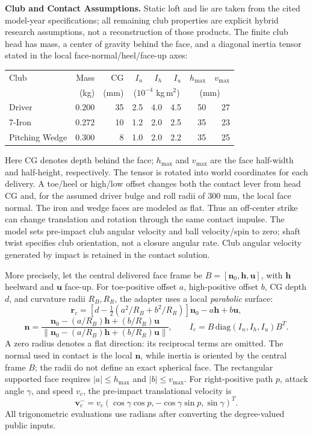 \documentclass[11pt,letterpaper]{article}
\begin{document}
\textbf{Club and Contact Assumptions.} Static loft and lie are taken from the
cited model-year specifications; all remaining club properties are explicit
hybrid research assumptions, not a reconstruction of those products. The
finite club head has mass, a center of gravity behind the face, and a diagonal
inertia tensor stated in the local face-normal/heel/face-up axes:
\begin{center}\small
\begin{tabular}{lrrrrrrr}
\toprule
Club & Mass & CG & $I_n$ & $I_h$ & $I_u$ & $h_{\max}$ & $v_{\max}$\\
 & (kg) & (mm) & \multicolumn{3}{c}{($10^{-4}$ kg\,m$^2$)} & \multicolumn{2}{c}{(mm)}\\
\midrule
Driver & 0.200 & 35 & 2.5 & 4.0 & 4.5 & 50 & 27\\
7-Iron & 0.272 & 10 & 1.2 & 2.0 & 2.5 & 35 & 23\\
Pitching Wedge & 0.300 & 8 & 1.0 & 2.0 & 2.2 & 35 & 25\\
\bottomrule
\end{tabular}
\end{center}
Here CG denotes depth behind the face; $h_{\max}$ and $v_{\max}$ are the
face half-width and half-height, respectively. The tensor is rotated into
world coordinates for each delivery. A toe/heel or
high/low offset changes both the contact lever from head CG and, for the
assumed driver bulge and roll radii of 300 mm, the local face normal. The iron
and wedge faces are modeled as flat. Thus an off-center strike can
change translation and rotation through the same contact impulse. The model
sets pre-impact club angular velocity and ball velocity/spin to zero; shaft
twist specifies club orientation, not a closure angular rate. Club angular
velocity generated by impact is retained in the contact solution.

More precisely, let the central delivered face frame be
$B=[\mathbf n_0,\mathbf h,\mathbf u]$, with $\mathbf h$ heelward and
$\mathbf u$ face-up. For toe-positive offset $a$, high-positive offset $b$,
CG depth $d$, and curvature radii $R_B,R_R$, the adapter uses a local
\emph{parabolic} surface:
\[
 \mathbf r_c=\left[d-\tfrac12(a^2/R_B+b^2/R_R)\right]\mathbf n_0
              -a\mathbf h+b\mathbf u,
\]
\[
 \mathbf n=\frac{\mathbf n_0-(a/R_B)\mathbf h+(b/R_R)\mathbf u}
 {\|\mathbf n_0-(a/R_B)\mathbf h+(b/R_R)\mathbf u\|},\qquad
 I_c=B\,\mathrm{diag}(I_n,I_h,I_u)B^T.
\]
A zero radius denotes a flat direction: its reciprocal terms are omitted.
The normal used in contact is the local $\mathbf n$, while inertia is oriented
by the central frame $B$; the radii do not define an exact spherical face.
The rectangular supported face requires $|a|\le h_{\max}$ and
$|b|\le v_{\max}$. For right-positive path $p$, attack angle $\gamma$,
and speed $v_c$, the pre-impact translational velocity is
\[
 \mathbf v_c^-=v_c(\cos\gamma\cos p,-\cos\gamma\sin p,\sin\gamma)^T.
\]
All trigonometric evaluations use radians after converting the degree-valued
public inputs.
\end{document}
